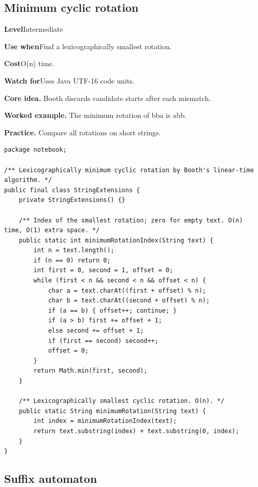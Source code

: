 \documentclass[10pt,letterpaper]{article}
\newcommand{\entrylabel}[1]{\textcolor{accent}{\bfseries #1}}
\begin{document}
\subsection{Minimum cyclic rotation}
\begin{guidebox}\small
\entrylabel{Level}\quad Intermediate\par
\entrylabel{Use when}\quad Find a lexicographically smallest rotation.\par
\entrylabel{Cost}\quad O(n) time.\par
\entrylabel{Watch for}\quad Uses Java UTF-16 code units.\par
\end{guidebox}
\noindent\textbf{Core idea.} Booth discards candidate starts after each mismatch.\par
\noindent\textbf{Worked example.} The minimum rotation of bba is abb.\par
\noindent\textbf{Practice.} Compare all rotations on short strings.\par
\begin{lstlisting}
package notebook;

/** Lexicographically minimum cyclic rotation by Booth's linear-time algorithm. */
public final class StringExtensions {
    private StringExtensions() {}

    /** Index of the smallest rotation; zero for empty text. O(n) time, O(1) extra space. */
    public static int minimumRotationIndex(String text) {
        int n = text.length();
        if (n == 0) return 0;
        int first = 0, second = 1, offset = 0;
        while (first < n && second < n && offset < n) {
            char a = text.charAt((first + offset) % n);
            char b = text.charAt((second + offset) % n);
            if (a == b) { offset++; continue; }
            if (a > b) first += offset + 1;
            else second += offset + 1;
            if (first == second) second++;
            offset = 0;
        }
        return Math.min(first, second);
    }

    /** Lexicographically smallest cyclic rotation. O(n). */
    public static String minimumRotation(String text) {
        int index = minimumRotationIndex(text);
        return text.substring(index) + text.substring(0, index);
    }
}
\end{lstlisting}
\subsection{Suffix automaton}
\end{document}
